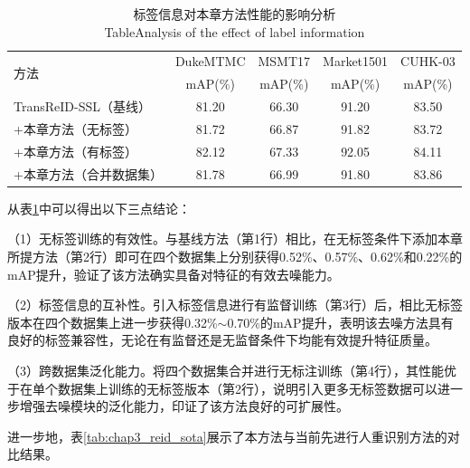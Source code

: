 \begin{table}[htbp]
\centering
\caption{标签信息对本章方法性能的影响分析\protect\\[-2pt]{\rm Table\;\thetable\quad Analysis of the effect of label information}}\label{tab:chap3_label}
\vspace{0.2cm}
\renewcommand{\arraystretch}{1.2}
\begin{tabular}{lcccc}
\hline \hline
\multirow{2}{*}{方法} & DukeMTMC & MSMT17 & Market1501 & CUHK-03 \\
 & mAP(\%) & mAP(\%) & mAP(\%) & mAP(\%) \\
\hline
TransReID-SSL（基线） & 81.20 & 66.30 & 91.20 & 83.50 \\
+本章方法（无标签） & 81.72 & 66.87 & 91.82 & 83.72 \\
+本章方法（有标签） & 82.12 & 67.33 & 92.05 & 84.11 \\
+本章方法（合并数据集） & 81.78 & 66.99 & 91.80 & 83.86 \\
\hline\hline
\end{tabular}
\end{table}

从表\ref{tab:chap3_label}中可以得出以下三点结论：

（1）无标签训练的有效性。与基线方法（第1行）相比，在无标签条件下添加本章所提方法（第2行）即可在四个数据集上分别获得0.52\%、0.57\%、0.62\%和0.22\%的mAP提升，验证了该方法确实具备对特征的有效去噪能力。

（2）标签信息的互补性。引入标签信息进行有监督训练（第3行）后，相比无标签版本在四个数据集上进一步获得0.32\%$\sim$0.70\%的mAP提升，表明该去噪方法具有良好的标签兼容性，无论在有监督还是无监督条件下均能有效提升特征质量。

（3）跨数据集泛化能力。将四个数据集合并进行无标注训练（第4行），其性能优于在单个数据集上训练的无标签版本（第2行），说明引入更多无标签数据可以进一步增强去噪模块的泛化能力，印证了该方法良好的可扩展性。

进一步地，表\ref{tab:chap3_reid_sota}展示了本方法与当前先进行人重识别方法的对比结果。

